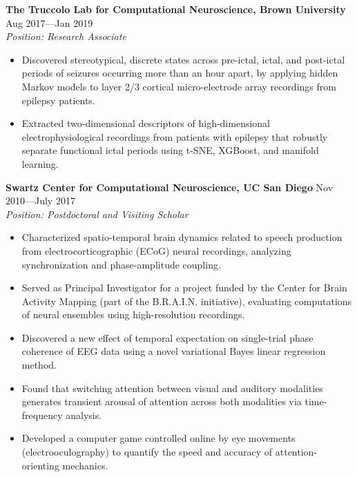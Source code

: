 \documentclass[10pt]{article}
\newcommand{\sectionleft}[1]{\noindent\makebox[0pt][r]{\makebox[1.1in][l]{\textbf{#1}}\hspace{0.2in}}}
\begin{document}
\vspace{0.08in}

\sectionleft{}%
\textbf{The Truccolo Lab for Computational Neuroscience, Brown University} \hfill Aug 2017---Jan 2019 \\
\sectionleft{}%
\textit{Position: Research Associate}
\begin{itemize}[leftmargin=1.5em, topsep=2pt, itemsep=1pt, parsep=1pt]

    \item Discovered stereotypical, discrete states across pre-ictal, ictal,
        and post-ictal periods of seizures occurring more than an hour apart,
        by applying hidden Markov models to layer 2/3 cortical micro-electrode
        array recordings from epilepsy patients.

    \item Extracted two-dimensional descriptors of high-dimensional
        electrophysiological recordings from patients with epilepsy that
        robustly separate functional ictal periods using t-SNE, XGBoost, and
        manifold learning.

\end{itemize}


\sectionleft{}%
\textbf{Swartz Center for Computational Neuroscience, UC San Diego} \hfill Nov 2010---July 2017 \\
\sectionleft{}%
\textit{Position: Postdoctoral and Visiting Scholar}
\begin{itemize}[leftmargin=1.5em, topsep=2pt, itemsep=1pt, parsep=1pt]
    \item Characterized spatio-temporal brain dynamics related to speech production from electrocorticographic (ECoG) neural recordings, analyzing synchronization and phase-amplitude coupling.
    \item Served as Principal Investigator for a project funded by the Center for Brain Activity Mapping (part of the B.R.A.I.N. initiative), evaluating computations of neural ensembles using high-resolution recordings.
    \item Discovered a new effect of temporal expectation on single-trial phase coherence of EEG data using a novel variational Bayes linear regression method.
    \item Found that switching attention between visual and auditory modalities generates transient arousal of attention across both modalities via time-frequency analysis.
    \item Developed a computer game controlled online by eye movements (electrooculography) to quantify the speed and accuracy of attention-orienting mechanics.
\end{itemize}
\end{document}
